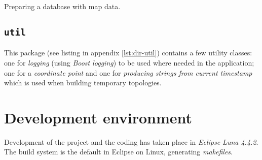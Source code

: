 \documentclass[../main.tex]{subfiles}
\begin{document}
\begin{mylisting}
\caption{Preparing a database with map data.}
\label{lst:prepare-database}
\end{mylisting}

\subsection{\texttt{util}}
This package (see listing in appendix \ref{lst:dir-util}) contains a few utility classes: one for \textit{logging} (using \textit{Boost logging}) to be used where needed in the application; one for a \textit{coordinate point} and one for \textit{producing strings from current timestamp} which is used when building temporary topologies.

\section{Development environment}
Development of the project and the coding has taken place in \textit{Eclipse Luna 4.4.2}. The build system is the default in Eclipse on Linux, generating \textit{makefiles}.
\end{document}
